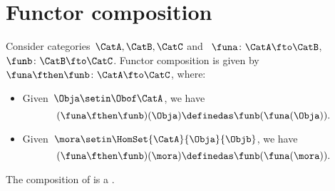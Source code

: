 
\section{Functor composition}
\begin{ctdefinition}
    \label{def:functor-composition}
    Consider categories~$\CatA,\CatB,\CatC$ and ~$\funa\colon \CatA\fto \CatB$,~$\funb \colon \CatB\fto \CatC$.
    Functor composition is given by~$\funa\fthen \funb\colon \CatA \fto \CatC$, where:
    \begin{itemize}
        \item Given~$\Obja\setin \Obof\CatA$, we have
              \begin{equation}
                  (\funa\fthen \funb)(\Obja)
                  \definedas\funb(\funa(\Obja)).
              \end{equation}
        \item Given~$\mora \setin \HomSet{\CatA}{\Obja}{\Objb}$, we have
              \begin{equation}
                  (\funa\fthen \funb)(\mora)
                  \definedas \funb(\funa(\mora)).
              \end{equation}
    \end{itemize}
\end{ctdefinition}
    
    



\begin{lemma}
    \label{lem:functors_compose}
    The composition of  is a .
\end{lemma}

